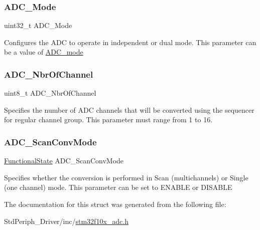 \subsubsection{\texorpdfstring{ADC\_Mode}{ADC\_Mode}}
{\footnotesize\ttfamily uint32\+\_\+t A\+D\+C\+\_\+\+Mode}

Configures the A\+DC to operate in independent or dual mode. This parameter can be a value of \mbox{\hyperlink{group___a_d_c__mode}{A\+D\+C\+\_\+mode}} \mbox{\label{struct_a_d_c___init_type_def_a7fd8f735de53f004a901bb4caf8bb62c}} 
\subsubsection{\texorpdfstring{ADC\_NbrOfChannel}{ADC\_NbrOfChannel}}
{\footnotesize\ttfamily uint8\+\_\+t A\+D\+C\+\_\+\+Nbr\+Of\+Channel}

Specifies the number of A\+DC channels that will be converted using the sequencer for regular channel group. This parameter must range from 1 to 16. \mbox{\label{struct_a_d_c___init_type_def_aa48a8ce21112f7262d5447bfe568e4b3}} 
\subsubsection{\texorpdfstring{ADC\_ScanConvMode}{ADC\_ScanConvMode}}
{\footnotesize\ttfamily \mbox{\hyperlink{group___exported__types_gac9a7e9a35d2513ec15c3b537aaa4fba1}{Functional\+State}} A\+D\+C\+\_\+\+Scan\+Conv\+Mode}

Specifies whether the conversion is performed in Scan (multichannels) or Single (one channel) mode. This parameter can be set to E\+N\+A\+B\+LE or D\+I\+S\+A\+B\+LE 

The documentation for this struct was generated from the following file\+:\begin{DoxyCompactItemize}
\item 
Std\+Periph\+\_\+\+Driver/inc/\mbox{\hyperlink{stm32f10x__adc_8h}{stm32f10x\+\_\+adc.\+h}}\end{DoxyCompactItemize}
